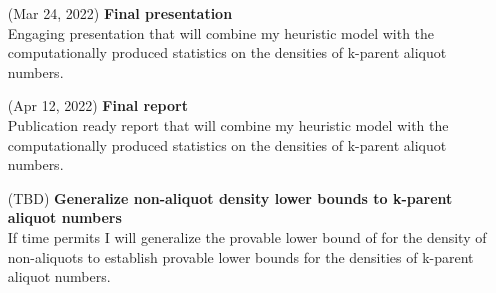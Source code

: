 \documentclass{article}
\theoremstyle{definition}
\begin{document}
\begin{itemize}
    \item[(Mar 24, 2022)] \textbf{Final presentation}\\
    Engaging presentation that will combine my heuristic model with the computationally produced statistics on the densities of k-parent aliquot numbers.
    \item[(Apr 12, 2022)] \textbf{Final report}\\
    Publication ready report that will combine my heuristic model with the computationally produced statistics on the densities of k-parent aliquot numbers.
    \item[(TBD)] \textbf{Generalize non-aliquot density lower bounds to k-parent aliquot numbers}\\
    If time permits I will generalize the provable lower bound of \cite{chen_zhao_2011} for the density of non-aliquots to establish provable lower bounds for the densities of k-parent aliquot numbers. 
\end{itemize}


 
\end{document}
